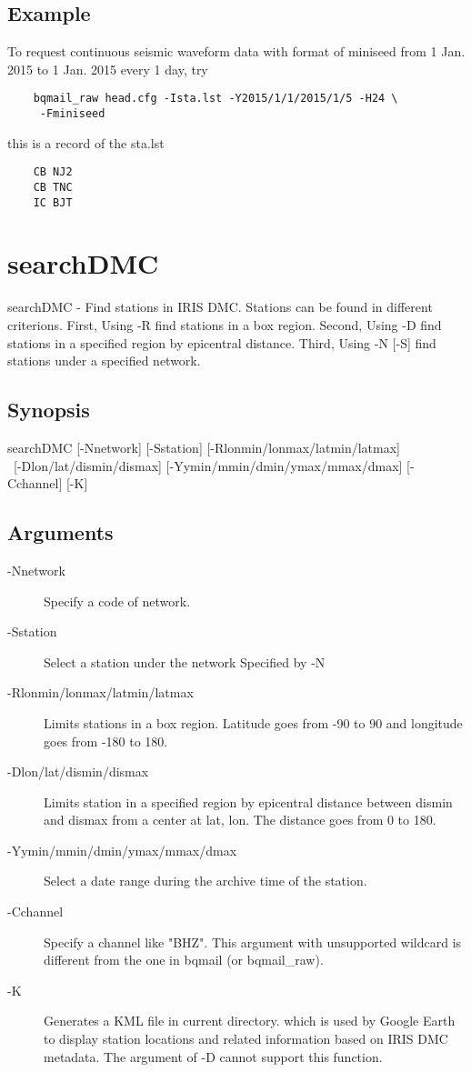 \documentclass[12pt, a4paper]{report}
\begin{document}
\subsection{Example}
To request continuous seismic waveform data with format of miniseed from 1 Jan. 2015 to 1 Jan. 2015 every 1 day, try
\begin{lstlisting}
	bqmail_raw head.cfg -Ista.lst -Y2015/1/1/2015/1/5 -H24 \ 
	 -Fminiseed
\end{lstlisting}
this is a record of the {\ti sta.lst}
\begin{lstlisting}
	CB NJ2
	CB TNC
	IC BJT
\end{lstlisting}

\section{searchDMC}
searchDMC - Find stations in IRIS DMC. Stations can be found in different criterions. First, Using {\tb -R} find stations in a box region. Second, Using {\tb -D} find stations in a specified region by epicentral distance. Third, Using {\tb -N [-S]} find stations under a specified network.
\subsection{Synopsis}
{\tb searchDMC} [{\tb -N}{\ti network}] [{\tb -S}{\ti station}] [{\tb -R}{\ti lonmin/lonmax/latmin/latmax}] \\\
[{\tb -D}{\ti lon/lat/dismin/dismax}] [{\tb -Y}{\ti ymin/mmin/dmin/ymax/mmax/dmax}] [{\tb -C}{\ti channel}] [{\tb -K}]
\subsection{Arguments}
\begin{description}
\item[{\tb -N}{\ti network}] Specify a code of network.
\item[{\tb -S}{\ti station}] Select a station under the network Specified by {\tb -N}
\item[{\tb -R}{\ti lonmin/lonmax/latmin/latmax}] Limits stations in a box region. Latitude goes from -90 to 90 and longitude goes from -180 to 180.
\item[{\tb -D}{\ti lon/lat/dismin/dismax}] Limits station in a specified region by epicentral distance between {\ti dismin} and {\ti dismax} from a center at {\ti lat, lon}. The distance goes from 0 to 180.
\item[{\tb -Y}{\ti ymin/mmin/dmin/ymax/mmax/dmax}] Select a date range during the archive time of the station.
\item[{\tb -C}{\ti channel}] Specify a channel like "{\ti BHZ}". This argument with unsupported wildcard is different from the one in {\tb bqmail} (or {\tb bqmail\_raw}).
\item[{\tb -K}] Generates a KML file in current directory. which is used by Google Earth to display station locations and related information based on IRIS DMC metadata.  The argument of {\tb -D} cannot support this function.
\end{description}
\end{document}

